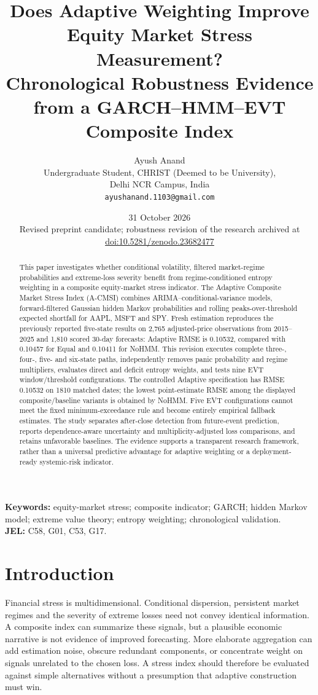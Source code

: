 \documentclass[11pt]{article}
\title{Does Adaptive Weighting Improve Equity Market Stress Measurement?\\
Chronological Robustness Evidence from a GARCH--HMM--EVT Composite Index}
\author{Ayush Anand\\\small Undergraduate Student, CHRIST (Deemed to be University),\\
\small Delhi NCR Campus, India\\\small\texttt{ayushanand.1103@gmail.com}}
\date{31 October 2026\\\small Revised preprint candidate; robustness revision of the research archived at\\
\small\href{https://doi.org/10.5281/zenodo.23682477}{doi:10.5281/zenodo.23682477}}
\begin{document}
\maketitle
\begin{abstract}
This paper investigates whether conditional volatility, filtered market-regime probabilities and extreme-loss
severity benefit from regime-conditioned entropy weighting in a composite equity-market stress indicator.
The Adaptive Composite Market Stress Index (A-CMSI) combines ARIMA--conditional-variance models,
forward-filtered Gaussian hidden Markov probabilities and rolling peaks-over-threshold expected shortfall
for AAPL, MSFT and SPY. Fresh estimation reproduces the previously reported five-state results on
2,765 adjusted-price observations from 2015--2025 and 1,810 scored 30-day forecasts: Adaptive RMSE is
0.10532, compared with 0.10457 for Equal and 0.10411 for NoHMM. This revision executes complete
three-, four-, five- and six-state paths, independently removes panic probability and regime multipliers,
evaluates direct and deficit entropy weights, and tests nine EVT window/threshold configurations.
The controlled Adaptive specification has RMSE 0.10532 on 1810 matched dates; the lowest point-estimate RMSE among the displayed composite/baseline variants is obtained by NoHMM. Five EVT configurations cannot meet the fixed minimum-exceedance rule and become entirely empirical fallback estimates.
The study separates after-close detection from future-event prediction, reports dependence-aware
uncertainty and multiplicity-adjusted loss comparisons, and retains unfavorable baselines.
The evidence supports a transparent research framework, rather than a universal predictive advantage
for adaptive weighting or a deployment-ready systemic-risk indicator.
\end{abstract}
\textbf{Keywords:} equity-market stress; composite indicator; GARCH; hidden Markov model;
extreme value theory; entropy weighting; chronological validation.\\
\textbf{JEL:} C58, G01, C53, G17.

\section{Introduction}
Financial stress is multidimensional. Conditional dispersion, persistent market regimes and the severity
of extreme losses need not convey identical information. A composite index can summarize these signals,
but a plausible economic narrative is not evidence of improved forecasting. More elaborate aggregation
can add estimation noise, obscure redundant components, or concentrate weight on signals unrelated to
the chosen loss. A stress index should therefore be evaluated against simple alternatives without a
presumption that adaptive construction must win.
\end{document}
